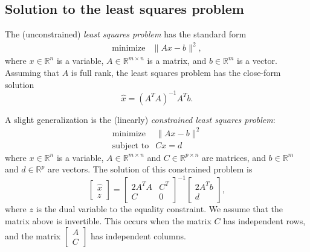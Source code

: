 \documentclass[12pt]{article}
\begin{document}
\subsection{Solution to the least squares problem}

The (unconstrained) \emph{least squares problem} has the standard form
\begin{equation*}
  \begin{array}{ll}
    \mbox{minimize} & \|Ax-b\|^2,
  \end{array}
\end{equation*}
where $x \in \mathbb{R}^n$ is a variable, $A \in \mathbb{R}^{m \times n}$ is a
matrix, and $b \in \mathbb{R}^m$ is a vector.
Assuming that $A$ is full rank, the least squares problem has the close-form
solution
\begin{equation*}
  \hat x = (A^T A)^{-1} A^T b.
\end{equation*}

A slight generalization is the (linearly) \emph{constrained least squares problem}:
\begin{equation*}
  \begin{array}{ll}
    \mbox{minimize} & \|Ax-b\|^2 \\
    \mbox{subject to} & Cx = d
  \end{array}
\end{equation*}
where $x \in \mathbb{R}^{n}$ is a variable, $A \in \mathbb{R}^{m \times n}$ and
$C \in \mathbb{R}^{p \times n}$ are matrices, and $b \in \mathbb{R}^m$ and
$d \in \mathbb{R}^p$ are vectors. The solution of this constrained problem is
\begin{equation*}
  \left[\begin{array}{c} \hat x \\ z \end{array}\right] =
  \left[\begin{array}{cc} 2A^TA & C^T \\ C & 0 \end{array}\right]^{-1}
  \left[\begin{array}{c} 2A^Tb \\ d \end{array}\right],
\end{equation*}
where $z$ is the dual variable to the equality constraint.
We assume that the matrix above is invertible.
This occurs when the matrix $C$ has independent rows, and the matrix
$\begin{bmatrix} A \\ C \end{bmatrix}$ has independent columns.
\end{document}
